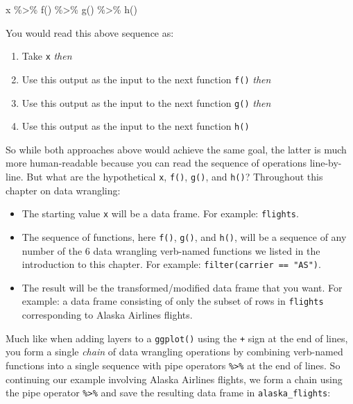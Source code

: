 \documentclass[
  letterpaper,
  DIV=11,
  numbers=noendperiod]{scrreprt}
\newenvironment{Shaded}{\begin{snugshade}}{\end{snugshade}}
\newcommand{\FunctionTok}[1]{\textcolor[rgb]{0.28,0.35,0.67}{#1}}
\newcommand{\NormalTok}[1]{\textcolor[rgb]{0.00,0.23,0.31}{#1}}
\newcommand{\SpecialCharTok}[1]{\textcolor[rgb]{0.37,0.37,0.37}{#1}}
\providecommand{\tightlist}{%
  \setlength{\itemsep}{0pt}\setlength{\parskip}{0pt}}\usepackage{longtable,booktabs,array}
\theoremstyle{definition}
\theoremstyle{remark}
\begin{document}
\begin{Shaded}
\begin{Highlighting}[]
\NormalTok{x }\SpecialCharTok{\%\textgreater{}\%} 
  \FunctionTok{f}\NormalTok{() }\SpecialCharTok{\%\textgreater{}\%} 
  \FunctionTok{g}\NormalTok{() }\SpecialCharTok{\%\textgreater{}\%} 
  \FunctionTok{h}\NormalTok{()}
\end{Highlighting}
\end{Shaded}

You would read this above sequence as:

\begin{enumerate}
\def\labelenumi{\arabic{enumi}.}
\tightlist
\item
  Take \texttt{x} \emph{then}
\item
  Use this output as the input to the next function \texttt{f()}
  \emph{then}
\item
  Use this output as the input to the next function \texttt{g()}
  \emph{then}
\item
  Use this output as the input to the next function \texttt{h()}
\end{enumerate}

So while both approaches above would achieve the same goal, the latter
is much more human-readable because you can read the sequence of
operations line-by-line. But what are the hypothetical \texttt{x},
\texttt{f()}, \texttt{g()}, and \texttt{h()}? Throughout this chapter on
data wrangling:

\begin{itemize}
\item
  The starting value \texttt{x} will be a data frame. For example:
  \texttt{flights}.
\item
  The sequence of functions, here \texttt{f()}, \texttt{g()}, and
  \texttt{h()}, will be a sequence of any number of the 6 data wrangling
  verb-named functions we listed in the introduction to this chapter.
  For example: \texttt{filter(carrier\ ==\ "AS")}.
\item
  The result will be the transformed/modified data frame that you want.
  For example: a data frame consisting of only the subset of rows in
  \texttt{flights} corresponding to Alaska Airlines flights.
\end{itemize}

Much like when adding layers to a \texttt{ggplot()} using the \texttt{+}
sign at the end of lines, you form a single \emph{chain} of data
wrangling operations by combining verb-named functions into a single
sequence with pipe operators \texttt{\%\textgreater{}\%} at the end of
lines. So continuing our example involving Alaska Airlines flights, we
form a chain using the pipe operator \texttt{\%\textgreater{}\%} and
save the resulting data frame in \texttt{alaska\_flights}:
\end{document}
